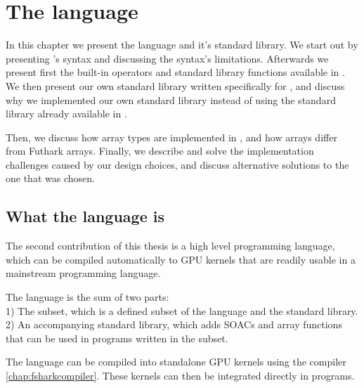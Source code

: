 \chapter{The \fshark{} language}
In this chapter we present the \fshark{} language and it's standard library.
We start out by presenting \fshark{}'s syntax and discussing the syntax's
limitations.
Afterwards we present first the built-in \fsharp{} operators and \fsharp{}
standard library functions available in \fshark{}.
We then present our own standard library written specifically for \fshark{}, and
discuss why we implemented our own standard library instead of using the
standard library already available in \fsharp{}.

Then, we discuss how array types are implemented in \fshark{}, and how
\fsharp{} arrays differ from Futhark arrays.
Finally, we describe and solve the implementation challenges caused by our
design choices, and discuss alternative solutions to the one that was chosen.

\section{What the \fshark{} language is}
\label{chap:fsharklanguage}
The second contribution of this thesis is a high level programming language,
which can be compiled automatically to GPU kernels that are readily usable in
a mainstream programming language.

The \fshark{} language is the sum of two parts: \\
1) The \fshark{} subset, which is a defined subset of the \fsharp{} language and
the \fsharp{} standard library.\\
2) An accompanying standard library, which adds SOACs and array functions that
can be used in programs written in the \fshark{} subset.

The \fshark{} language can be compiled into standalone GPU kernels using the
\fshark{} compiler \ref{chap:fsharkcompiler}. These kernels can then be integrated directly in
\fsharp{} programs.

